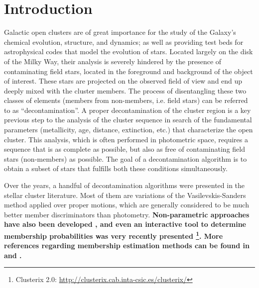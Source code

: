 \documentclass{aa}
\begin{document}

\maketitle



\section{Introduction}
 \label{sec:intro}

 Galactic open clusters are of great importance for the study of the
 Galaxy's chemical evolution, structure, and dynamics; as well as providing
 test beds for astrophysical codes that model the evolution of stars.
 Located largely on the disk of the Milky Way, their analysis is severely
 hindered by the presence of contaminating field stars, located in the
 foreground and background of the object of interest. These stars are
 projected on the observed field of view and end up deeply mixed
 with the cluster members. The process of disentangling these two classes of
 elements (members from non-members, i.e. field stars) can be referred
 to as ``decontamination''.
 A proper decontamination of the cluster region is a key previous step to the
 analysis of the cluster sequence in search of the fundamental parameters 
 (metallicity, age, distance, extinction, etc.) that characterize the open
 cluster. This analysis, which is often performed in photometric
 space, requires a sequence that is as complete as possible, but also as free
 of contaminating field stars (non-members) as possible. The goal of a
 decontamination algorithm is to obtain a subset of stars that fulfills both
 these conditions simultaneously.

 Over the years, a handful of decontamination algorithms were presented in the
 stellar cluster literature. Most of them are variations of the
 Vasilevskis-Sanders method \citep{Vasilevskis_1958,Sanders_1971} applied over
 proper motions, which are generally considered to be much better member
 discriminators than photometry.
 \textbf{
 Non-parametric approaches have also been developed
 \citep{Cabrera_1990,Javakhishvili_2006}, and even an interactive tool to
 determine membership probabilities was very recently presented
 \citep{Balaguer_2020}\footnote{Clusterix 2.0:
 \url{http://clusterix.cab.inta-csic.es/clusterix/}}.
 More references regarding membership estimation methods can be found in
 \citet[][henceforth KMM14]{KMM14} and \citet{Perren_2015}.
 }
\end{document}
